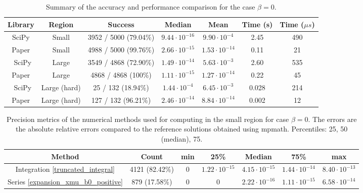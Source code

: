\documentclass[10pt,a4paper,oneside]{article}
\numberwithin{equation}{section}
\begin{document}
\begin{table}[htbp]
\centering
\scalebox{0.9}
{
\begin{tabular}{ccccc|cc}
\hline
Library & Region & Success & Median & Mean &  Time (s) & Time ($\mu s$)\\
\hline
SciPy & Small & 3952 / 5000 (79.04\%) &  $9.44\cdot 10^{-16}$ & $9.90 \cdot 10^{-4}$ & 2.45 & 490\\
Paper & Small & 4988 / 5000 (99.76\%) & $2.66\cdot 10^{-15}$ & $1.53\cdot 10^{-14}$ & 0.11 & 21\\
	\hline\
SciPy & Large & 3549 / 4868 (72.90\%) & $1.49\cdot 10^{-14}$ & $5.63\cdot 10^{-3}$ & 2.60 & 535\\
Paper & Large & 4868 / 4868 (100\%) & $1.11\cdot 10^{-15}$ & $1.27\cdot 10^{-14}$ & 0.22 & 45\\
	\hline\
SciPy & Large (hard) & 25 / 132 (18.94\%) & $1.44\cdot 10^{-4}$ & $6.45\cdot 10^{-3}$ & 0.028 & 214\\
Paper & Large (hard) & 127 / 132 (96.21\%) & $2.46\cdot 10^{-14}$ & $8.84\cdot 10^{-14}$ & 0.002 & 12\\
	\hline
	\end{tabular}
	}
	\caption{Summary of the accuracy and performance comparison for the case $\beta = 0$.}
	\label{table_comparison_case_beta_eq_zero_summary}
\end{table}


\begin{table}[htbp]
\centering
\scalebox{0.9}
{
\begin{tabular}{ccccccc}
\hline
Method & Count & min & 25\% & Median & 75\% & max\\
\hline
Integration \eqref{truncated_integral} & 4121 (82.42\%) & 0 & $1.22\cdot 10^{-15}$ & $4.15\cdot 10^{-15}$ & $1.44\cdot 10^{-14}$ & $8.40\cdot 10^{-13}$\\
Series \eqref{expansion_xmu_b0_positive} & 879 (17.58\%) & 0 & 0 & $2.22\cdot 10^{-16}$ & $1.11\cdot 10^{-15}$ & $6.58\cdot 10^{-14}$\\
	\hline
\end{tabular}
}
	\caption{Precision metrics of the numerical methods used for computing in the small region for case $\beta = 0$. The errors are the absolute relative errors compared to the reference solutions obtained using mpmath. Percentiles: 25, 50 (median), 75.}
	\label{table_methods_case_beta_eq_zero_small}
\end{table}
\end{document}
